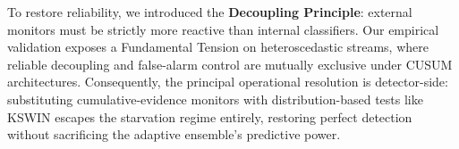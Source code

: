 \documentclass[10pt,conference]{IEEEtran}
\theoremstyle{definition}
\begin{document}
To restore reliability, we introduced the \textbf{Decoupling Principle}: external monitors must be strictly more reactive than internal classifiers. Our empirical validation exposes a Fundamental Tension on heteroscedastic streams, where reliable decoupling and false-alarm control are mutually exclusive under CUSUM architectures. Consequently, the principal operational resolution is detector-side: substituting cumulative-evidence monitors with distribution-based tests like KSWIN escapes the starvation regime entirely, restoring perfect detection without sacrificing the adaptive ensemble's predictive power.



\end{document}

